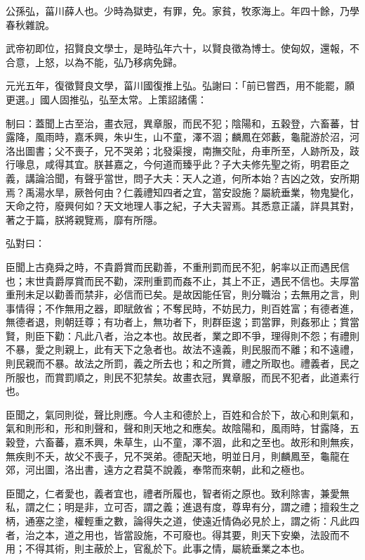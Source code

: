 
\begin{pinyinscope}
公孫弘，菑川薛人也。少時為獄吏，有罪，免。家貧，牧豕海上。年四十餘，乃學春秋雜說。

武帝初即位，招賢良文學士，是時弘年六十，以賢良徵為博士。使匈奴，還報，不合意，上怒，以為不能，弘乃移病免歸。

元光五年，復徵賢良文學，菑川國復推上弘。弘謝曰：「前已嘗西，用不能罷，願更選。」國人固推弘，弘至太常。上策詔諸儒：

制曰：蓋聞上古至治，畫衣冠，異章服，而民不犯；陰陽和，五穀登，六畜蕃，甘露降，風雨時，嘉禾興，朱屮生，山不童，澤不涸；麟鳳在郊藪，龜龍游於沼，河洛出圖書；父不喪子，兄不哭弟；北發渠搜，南撫交阯，舟車所至，人跡所及，跂行喙息，咸得其宜。朕甚嘉之，今何道而臻乎此？子大夫修先聖之術，明君臣之義，講論洽聞，有聲乎當世，問子大夫：天人之道，何所本始？吉凶之效，安所期焉？禹湯水旱，厥咎何由？仁義禮知四者之宜，當安設施？屬統垂業，物鬼變化，天命之符，廢興何如？天文地理人事之紀，子大夫習焉。其悉意正議，詳具其對，著之于篇，朕將親覽焉，靡有所隱。

弘對曰：

臣聞上古堯舜之時，不貴爵賞而民勸善，不重刑罰而民不犯，躬率以正而遇民信也；末世貴爵厚賞而民不勸，深刑重罰而姦不止，其上不正，遇民不信也。夫厚當重刑未足以勸善而禁非，必信而已矣。是故因能任官，則分職治；去無用之言，則事情得；不作無用之器，即賦斂省；不奪民時，不妨民力，則百姓富；有德者進，無德者退，則朝廷尊；有功者上，無功者下，則群臣逡；罰當罪，則姦邪止；賞當賢，則臣下勸：凡此八者，治之本也。故民者，業之即不爭，理得則不怨；有禮則不暴，愛之則親上，此有天下之急者也。故法不遠義，則民服而不離；和不遠禮，則民親而不暴。故法之所罰，義之所去也；和之所賞，禮之所取也。禮義者，民之所服也，而賞罰順之，則民不犯禁矣。故畫衣冠，異章服，而民不犯者，此道素行也。

臣聞之，氣同則從，聲比則應。今人主和德於上，百姓和合於下，故心和則氣和，氣和則形和，形和則聲和，聲和則天地之和應矣。故陰陽和，風雨時，甘露降，五穀登，六畜蕃，嘉禾興，朱草生，山不童，澤不涸，此和之至也。故形和則無疾，無疾則不夭，故父不喪子，兄不哭弟。德配天地，明並日月，則麟鳳至，龜龍在郊，河出圖，洛出書，遠方之君莫不說義，奉幣而來朝，此和之極也。

臣聞之，仁者愛也，義者宜也，禮者所履也，智者術之原也。致利除害，兼愛無私，謂之仁；明是非，立可否，謂之義；進退有度，尊卑有分，謂之禮；擅殺生之柄，通塞之塗，權輕重之數，論得失之道，使遠近情偽必見於上，謂之術：凡此四者，治之本，道之用也，皆當設施，不可廢也。得其要，則天下安樂，法設而不用；不得其術，則主蔽於上，官亂於下。此事之情，屬統垂業之本也。


\end{pinyinscope}

